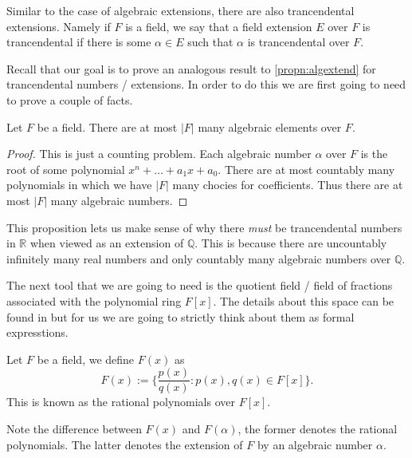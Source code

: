\begin{defn}
  Similar to the case of algebraic extensions, there are also trancendental
  extensions. Namely if $F$ is a field, we say that a field extension $E$ over
  $F$ is trancendental if there is some $\alpha \in E$ such that $\alpha$ is
  trancendental over $F$.
\end{defn}

Recall that our goal is to prove an analogous result to \cref{propn:algextend}
for trancendental numbers / extensions. In order to do this we are first going
to need to prove a couple of facts. 

\begin{propn}\label{propn:existtrans}
  Let $F$ be a field. There are at most $|F|$ many algebraic elements over $F$.
\end{propn}
\begin{proof}
  This is just a counting problem. Each algebraic number $\alpha$ over $F$ is
  the root of some polynomial $x^{n} + \ldots + a_1x + a_0$. There are at most
  countably many polynomials in which we have $|F|$ many chocies for
  coefficients. Thus there are at most $|F|$ many algebraic numbers.
\end{proof}

This proposition lets us make sense of why there \textit{must} be trancendental
numbers in $\mathbb{R}$ when viewed as an extension of $\mathbb{Q}$. This is
because there are uncountably infinitely many real numbers and only countably
many algebraic numbers over $\mathbb{Q}$. 

The next tool that we are going to need is the quotient field / field of
fractions associated with the polynomial ring $F[x]$. The details about this
space can be found in \cite{Dummit_Foote_2004} but for us we are going to
strictly think about them as formal expresstions.

\begin{defn}
  Let $F$ be a field, we define $F(x)$ as
  \[
    F(x) := \{\frac{p(x)}{q(x)}: p(x), q(x) \in F[x]\} 
  .\] 
  This is known as the rational polynomials over $F[x]$.
\end{defn}

\begin{remark}
  Note the difference between $F(x)$ and $F(\alpha)$, the former denotes the
  rational polynomials. The latter denotes the extension of $F$ by an algebraic
  number $\alpha$.
\end{remark}

